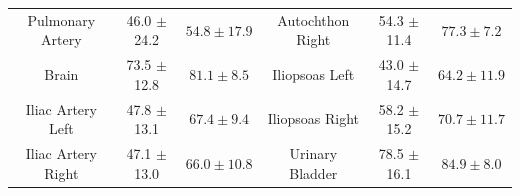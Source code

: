 \begin{table}[t!]
{{\begin{tabular}{cccccc}
Pulmonary Artery & 46.0 $\pm$ 24.2 & $\bm{54.8 \pm 17.9}$ & Autochthon Right & 54.3 $\pm$ 11.4 & $\bm{77.3 \pm 7.2}$ \\
Brain & 73.5 $\pm$ 12.8 & $\bm{81.1 \pm 8.5}$ & Iliopsoas Left & 43.0 $\pm$ 14.7 & $\bm{64.2 \pm 11.9}$ \\
Iliac Artery Left & 47.8 $\pm$ 13.1 & $\bm{67.4 \pm 9.4}$ & Iliopsoas Right & 58.2 $\pm$ 15.2 & $\bm{70.7 \pm 11.7}$ \\
Iliac Artery Right & 47.1 $\pm$ 13.0 & $\bm{66.0 \pm 10.8}$ & Urinary Bladder & 78.5 $\pm$ 16.1 & $\bm{84.9 \pm 8.0}$ \\
\bottomrule[1.5pt]
\end{tabular}}
}
\label{tab:9}
\end{table}